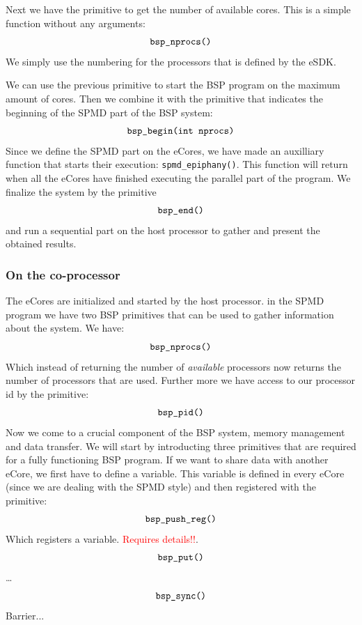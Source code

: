 \documentclass[fleqn]{article}
\renewcommand{\(}{\left(}
\renewcommand{\)}{\right)}
\newcommand{\todo}[1]{\textcolor{red}{#1}}
\begin{document}
Next we have the primitive to get the number of available cores.  This is a simple function without any arguments:
\begin{equation}
    \verb.bsp_nprocs(). 
\end{equation}
We simply use the numbering for the processors that is defined by the eSDK.

We can use the previous primitive to start the BSP program on the maximum amount of cores. Then we combine it with the primitive that indicates the beginning of the SPMD part of the BSP system:
\begin{equation}
    \verb.bsp_begin(int nprocs). 
\end{equation}
Since we define the SPMD part on the eCores, we have made an auxilliary function that starts their execution: \verb.spmd_epiphany().. This function will return when all the eCores have finished executing the parallel part of the program. We finalize the system by the primitive
\begin{equation}
    \verb.bsp_end(). 
\end{equation}
and run a sequential part on the host processor to gather and present the obtained results.

\subsubsection{On the co-processor}

The eCores are initialized and started by the host processor. in the SPMD program we have two BSP primitives that can be used to gather information about the system. We have:
\begin{equation}
    \verb.bsp_nprocs(). 
\end{equation}
Which instead of returning the number of \emph{available} processors now returns the number of processors that are used. Further more we have access to our processor id by the primitive:
\begin{equation}
    \verb.bsp_pid(). 
\end{equation}
Now we come to a crucial component of the BSP system, memory management and data transfer. We will start by introducting three primitives that are required for a fully functioning BSP program. If we want to share data with another eCore, we first have to define a variable. This variable is defined in every eCore (since we are dealing with the SPMD style) and then registered with the primitive:
\begin{equation}
    \verb.bsp_push_reg(). 
\end{equation}
Which registers a variable. \todo{Requires details!!}.
\begin{equation}
    \verb.bsp_put(). 
\end{equation}
\ldots
\begin{equation}
    \verb.bsp_sync(). 
\end{equation}
Barrier...
\end{document}
